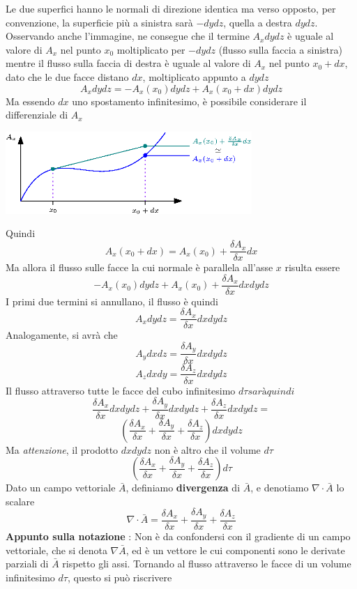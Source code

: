 \documentclass[10pt, letterpaper]{report}
\begin{document}
Le due superfici hanno le normali di direzione identica ma verso opposto, per convenzione, la superficie più a sinistra sarà $-dydz$, quella a destra $dydz$. Osservando anche l'immagine, ne consegue che il termine $A_xdydz$ è uguale al valore di $A_x$ nel punto $x_0$ moltiplicato per $-dydz$ (flusso sulla faccia a sinistra) mentre il flusso sulla faccia di destra è uguale al valore di $A_x$ nel punto $x_0+dx$, dato che le due facce distano $dx$, moltiplicato appunto a $dydz$
$$ A_xdydz=-A_x(x_0)dydz+A_x(x_0+dx)dydz $$
Ma essendo $dx$ uno spostamento infinitesimo, è possibile considerare il differenziale di $A_x$\begin{center}
    \includegraphics[width=0.7\textwidth]{images/Differenziale3.eps}
\end{center}
Quindi 
$$A_x(x_0+dx)=A_x(x_0)+\frac{\delta A_x}{\delta x}dx $$
Ma allora il flusso sulle facce la cui normale è parallela all'asse $x$ risulta essere 
$$ -A_x(x_0)dydz+A_x(x_0)+\frac{\delta A_x}{\delta x}dxdydz$$
I primi due termini si annullano, il flusso è quindi 
$$A_xdydz=\frac{\delta A_x}{\delta x}dxdydz$$
Analogamente, si avrà che 
$$A_ydxdz=\frac{\delta A_y}{\delta x}dxdydz$$
$$A_zdxdy=\frac{\delta A_z}{\delta x}dxdydz$$
Il flusso attraverso tutte le facce del cubo infinitesimo $d\tau sarà quindi$
$$ \frac{\delta A_x}{\delta x}dxdydz+\frac{\delta A_y}{\delta x}dxdydz+\frac{\delta A_z}{\delta x}dxdydz=$$
$$ (\frac{\delta A_x}{\delta x}+\frac{\delta A_y}{\delta x}+\frac{\delta A_z}{\delta x})dxdydz$$
Ma \textit{attenzione}, il prodotto $dxdydz$ non è altro che il volume $d\tau$
$$ (\frac{\delta A_x}{\delta x}+\frac{\delta A_y}{\delta x}+\frac{\delta A_z}{\delta x})d\tau$$
 Dato un campo vettoriale $\bar A$, definiamo \textbf{divergenza} di $\bar A$, e denotiamo $\nabla \cdot \bar A$ lo scalare 
$$\nabla \cdot \bar A= \frac{\delta A_x}{\delta x}+\frac{\delta A_y}{\delta x}+\frac{\delta A_z}{\delta x}$$
\textbf{Appunto sulla notazione} : Non è da confondersi con il gradiente di un campo vettoriale, che si denota $\nabla \bar A$, ed è un vettore le cui componenti sono le derivate parziali di $\bar A$ rispetto gli assi.\acc 
Tornando al flusso attraverso le facce di un volume infinitesimo $d\tau$, questo si può riscrivere 
\end{document}
